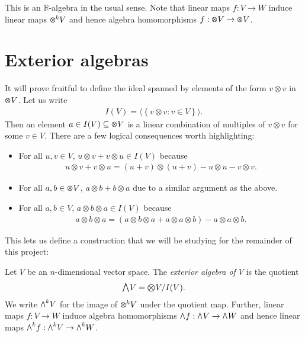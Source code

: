 \documentclass{article}
\begin{document}
This is an $\mathbb{R}$-algebra in the usual sense. Note that linear
maps $f:V\to W$ induce linear maps $\tensor{k}{V}$ and hence algebra
homomorphisms $f:\tensor{}{V}\to\tensor{}{V}$.

\section{Exterior algebras}

It will prove fruitful to define the ideal spanned by elements of the form $v\otimes v$ in $\tensor{}{V}$. Let us write
\begin{align*}
  I(V) = \langle\left\lbrace{v\otimes v : v \in V}\right\rbrace\rangle.
\end{align*}
Then an element $a\in I(V)\subseteq \tensor{}{V}$ is a linear combination
of multiples of $v\otimes v$ for some $v\in V$. There are a few
logical consequences worth highlighting:
\begin{itemize}
  \item For all $u,v\in V$, $u\otimes v + v \otimes u \in I(V)$
    because
    \begin{align*}
      u\otimes v + v \otimes u = (u+v)\otimes(u+v)-u\otimes u-v\otimes v.
    \end{align*}
  \item For all $a,b\in\tensor{}{V}$, $a\otimes b+b\otimes a$ due to
    a similar argument as the above. 
  \item For all $a,b\in V$, $a\otimes b\otimes a\in I(V)$ because
    \begin{align*}
      a\otimes b\otimes a = (a\otimes b\otimes a + a \otimes a \otimes b) - a\otimes a\otimes b.
    \end{align*}
\end{itemize}

This lets us define a construction that we will be studying for the remainder
of this project:

\begin{definition}
  Let $V$ be an $n$-dimensional vector space. The \emph{exterior algebra of
  $V$} is the quotient
  \begin{align*}
    \exterior{}{V} = \tensor{}{V}/I(V).
  \end{align*}
  We write $\exterior{k}{V}$ for the image of $\tensor{k}{V}$ under the quotient
  map. Further, linear maps $f:V\to W$ induce algebra homomorphisms
  $\exterior{}{f}:\exterior{}{V}\to\exterior{}{W}$ and hence linear maps
  $\exterior{k}{f}:\exterior{k}{V}\to\exterior{k}{W}$.
\end{definition}
\end{document}
